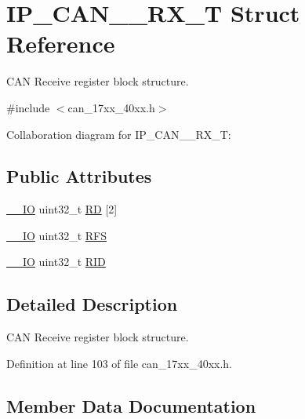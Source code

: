 \hypertarget{structIP__CAN__001__RX__T}{}\section{I\+P\+\_\+\+C\+A\+N\+\_\+\_\+\+R\+X\+\_\+T Struct Reference}
\label{structIP__CAN__001__RX__T}


C\+AN Receive register block structure.  




{\ttfamily \#include $<$can\+\_\+17xx\+\_\+40xx.\+h$>$}



Collaboration diagram for I\+P\+\_\+\+C\+A\+N\+\_\+\_\+\+R\+X\+\_\+T\+:
\subsection*{Public Attributes}
\begin{DoxyCompactItemize}
\item 
\hyperlink{core__cm3_8h_aec43007d9998a0a0e01faede4133d6be}{\+\_\+\+\_\+\+IO} uint32\+\_\+t \hyperlink{structIP__CAN__001__RX__T_a7b9fd4220efbbd69d33c81d887803b69}{RD} \mbox{[}2\mbox{]}
\item 
\hyperlink{core__cm3_8h_aec43007d9998a0a0e01faede4133d6be}{\+\_\+\+\_\+\+IO} uint32\+\_\+t \hyperlink{structIP__CAN__001__RX__T_aa5c1bc243bb1763d92e9070d84b594cf}{R\+FS}
\item 
\hyperlink{core__cm3_8h_aec43007d9998a0a0e01faede4133d6be}{\+\_\+\+\_\+\+IO} uint32\+\_\+t \hyperlink{structIP__CAN__001__RX__T_a9b8287992a2f69010823997db04d7ef6}{R\+ID}
\end{DoxyCompactItemize}


\subsection{Detailed Description}
C\+AN Receive register block structure. 

Definition at line 103 of file can\+\_\+17xx\+\_\+40xx.\+h.



\subsection{Member Data Documentation}
